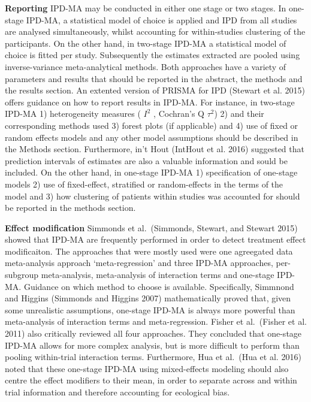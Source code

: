 \documentclass[]{article}
\begin{document}
\textbf{Reporting} IPD-MA may be conducted in either one stage or two
stages. In one-stage IPD-MA, a statistical model of choice is applied
and IPD from all studies are analysed simultaneously, whilst accounting
for within-studies clustering of the participants. On the other hand, in
two-stage IPD-MA a statistical model of choice is fitted per study.
Subsequently the estimates extracted are pooled using inverse-variance
meta-analytical methods. Both approaches have a variety of parameters
and results that should be reported in the abstract, the methods and the
results section. An extented version of PRISMA for IPD (Stewart et al.
2015) offers guidance on how to report results in IPD-MA. For instance,
in two-stage IPD-MA 1) heterogeneity measures ( \(I^2\) , Cochran's Q
\(\tau^2\)) 2) and their corresponding methods used 3) forest plots (if
applicable) and 4) use of fixed or random effects models and any other
model assumptions should be described in the Methods section.
Furthermore, in't Hout (IntHout et al. 2016) suggested that prediction
intervals of estimates are also a valuable information and sould be
included. On the other hand, in one-stage IPD-MA 1) specification of
one-stage models 2) use of fixed-effect, stratified or random-effects in
the terms of the model and 3) how clustering of patients within studies
was accounted for should be reported in the methods section.

\textbf{Effect modification} Simmonds et al.~(Simmonds, Stewart, and
Stewart 2015) showed that IPD-MA are frequently performed in order to
detect treatment effect modificaiton. The approaches that were mostly
used were one agreegated data meta-analysis approach `meta-regression'
and three IPD-MA approaches, per-subgroup meta-analysis, meta-analysis
of interaction terms and one-stage IPD-MA. Guidance on which method to
choose is available. Specifically, Simmnond and Higgins (Simmonds and
Higgins 2007) mathematically proved that, given some unrealistic
assumptions, one-stage IPD-MA is always more powerful than meta-analysis
of interaction terms and meta-regression. Fisher et al.~(Fisher et al.
2011) also critically reviewed all four approaches. They concluded that
one-stage IPD-MA allows for more complex analysis, but is more difficult
to perform than pooling within-trial interaction terms. Furthermore, Hua
et al.~(Hua et al. 2016) noted that these one-stage IPD-MA using
mixed-effects modeling should also centre the effect modifiers to their
mean, in order to separate across and within trial information and
therefore accounting for ecological bias.
\end{document}
